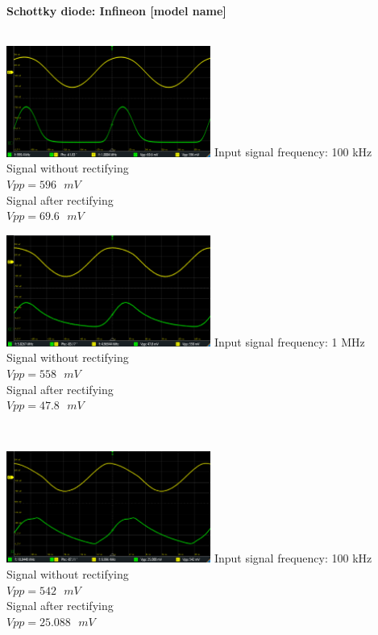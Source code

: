 \documentclass[12pt,a4paper,bold]{thesis}
\theoremstyle{thm}
\theoremstyle{definition}
\begin{document}
\\\\
\textbf{Schottky diode: Infineon [model name]}\\\\
\begin{minipage}[b]{0.48\linewidth}
\includegraphics[width=6.7cm]{Images/Infinion/RF1MHz.png}  
Input signal frequency: 100 kHz\\
Signal without rectifying\\
$Vpp = 596\text{ }mV$\\
Signal after rectifying\\
$Vpp = 69.6\text{ }mV$\\
\end{minipage}
\hfill
\begin{minipage}[b]{0.48\linewidth}
\includegraphics[width=6.7cm]{Images/Infinion/RF5MHz.png}  
Input signal frequency: 1 MHz\\
Signal without rectifying\\
$Vpp = 558\text{ }mV$\\
Signal after rectifying\\
$Vpp = 47.8\text{ }mV$\\
\end{minipage}
\\
\begin{minipage}[b]{0.48\linewidth}
\includegraphics[width=6.7cm]{Images/Infinion/RF10MHz.png}  
Input signal frequency: 100 kHz\\
Signal without rectifying\\
$Vpp = 542\text{ }mV$\\
Signal after rectifying\\
$Vpp = 25.088\text{ }mV$\\
\end{minipage}
\end{document}
